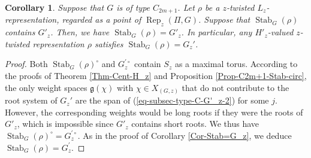 \documentclass[11pt,oneside,dvipsnames]{amsart}
\theoremstyle{plain}
\newtheorem{Cor}[Thm]{Corollary}
\theoremstyle{definition}
\theoremstyle{named}
\DeclareMathOperator{\Rep}{Rep}
\DeclareMathOperator{\Stab}{Stab}
\begin{document}
\begin{Cor}\label{Cor-Stab=G_z'}
Suppose that $G$ is of type $C_{2m+1}$. Let $\rho$ be a $z$-twisted $L_z$-representation, regarded as a point of $\Rep_z(\Pi,G)$. Suppose that $\Stab_G(\rho)$ contains $G'_z$. Then, we have $\Stab_G(\rho)=G'_z$. In particular, any $H'_z$-valued $z$-twisted representation $\rho$ satisfies $\Stab_G(\rho)=G_z'$.

\end{Cor}
\begin{proof}
Both $\Stab_G(\rho)^{\circ}$ and $G_z^{\prime\circ}$ contain $S_z$ as a maximal torus. According to the proofs of Theorem \ref{Thm-Cent-H_z} and Proposition \ref{Prop-C2m+1-Stab-circ}, the only weight spaces $\mathfrak{g}(\chi)$ with $\chi\in X_{(G,z)}$ that do not contribute to the root system of $G_z'$ are the span of (\ref{eq-subsec-type-C-G'_z-2}) for some $j$. However, the corresponding weights would be long roots if they were the roots of $G'_z$, which is impossible since $G'_z$ contains short roots. We thus have $\Stab_G(\rho)^{\circ}=G_z^{\prime\circ}$. As in the proof of Corollary \ref{Cor-Stab=G_z}, we deduce $\Stab_G(\rho)=G_z^{\prime}$.
\end{proof}
\end{document}
